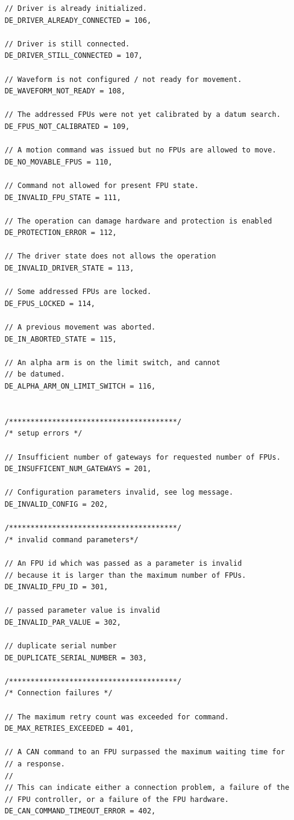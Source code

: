 \documentclass[11pt,a4paper]{scrartcl}
\begin{document}
\begin{verbatim}
    // Driver is already initialized.
    DE_DRIVER_ALREADY_CONNECTED = 106,

    // Driver is still connected.
    DE_DRIVER_STILL_CONNECTED = 107,

    // Waveform is not configured / not ready for movement.
    DE_WAVEFORM_NOT_READY = 108,

    // The addressed FPUs were not yet calibrated by a datum search.
    DE_FPUS_NOT_CALIBRATED = 109,

    // A motion command was issued but no FPUs are allowed to move.
    DE_NO_MOVABLE_FPUS = 110,

    // Command not allowed for present FPU state.
    DE_INVALID_FPU_STATE = 111,

    // The operation can damage hardware and protection is enabled
    DE_PROTECTION_ERROR = 112,

    // The driver state does not allows the operation
    DE_INVALID_DRIVER_STATE = 113,

    // Some addressed FPUs are locked.
    DE_FPUS_LOCKED = 114,

    // A previous movement was aborted.
    DE_IN_ABORTED_STATE = 115,

    // An alpha arm is on the limit switch, and cannot
    // be datumed.
    DE_ALPHA_ARM_ON_LIMIT_SWITCH = 116,


    /***************************************/
    /* setup errors */

    // Insufficient number of gateways for requested number of FPUs.
    DE_INSUFFICENT_NUM_GATEWAYS = 201,

    // Configuration parameters invalid, see log message.
    DE_INVALID_CONFIG = 202,

    /***************************************/
    /* invalid command parameters*/

    // An FPU id which was passed as a parameter is invalid
    // because it is larger than the maximum number of FPUs.
    DE_INVALID_FPU_ID = 301,

    // passed parameter value is invalid
    DE_INVALID_PAR_VALUE = 302,

    // duplicate serial number
    DE_DUPLICATE_SERIAL_NUMBER = 303,

    /***************************************/
    /* Connection failures */

    // The maximum retry count was exceeded for command.
    DE_MAX_RETRIES_EXCEEDED = 401,

    // A CAN command to an FPU surpassed the maximum waiting time for
    // a response.
    //
    // This can indicate either a connection problem, a failure of the
    // FPU controller, or a failure of the FPU hardware.
    DE_CAN_COMMAND_TIMEOUT_ERROR = 402,


\end{verbatim}
\end{document}
